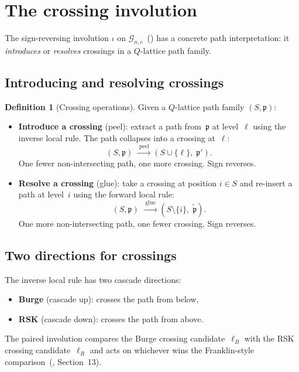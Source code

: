 \documentclass[11pt]{article}
\theoremstyle{plain}
\theoremstyle{definition}
\newtheorem{definition}[theorem]{Definition}
\begin{document}
\section{The crossing involution}
\label{sec:crossing-invol}

The sign-reversing involution $\iota$ on
$\mathcal{G}_{n,c}$~(\cite{LOCAL_RULE}) has a concrete
path interpretation: it \emph{introduces} or \emph{resolves}
crossings in a $Q$-lattice path family.


\subsection{Introducing and resolving crossings}

\begin{definition}[Crossing operations]
\label{def:crossing-ops}
Given a $Q$-lattice path family $(S, \mathfrak{p})$:
\begin{itemize}
  \item \textbf{Introduce a crossing} (peel): extract a
    path from~$\mathfrak{p}$ at level~$\ell$ using the
    inverse local rule.  The path collapses into a crossing
    at~$\ell$:
    \[
      (S, \mathfrak{p}) \;\xrightarrow{\;\text{peel}\;}
      (S \cup \{\ell\},\; \mathfrak{p}').
    \]
    One fewer non-intersecting path, one more crossing.
    Sign reverses.

  \item \textbf{Resolve a crossing} (glue): take a
    crossing at position $i \in S$ and re-insert a path
    at level~$i$ using the forward local rule:
    \[
      (S, \mathfrak{p}) \;\xrightarrow{\;\text{glue}\;}
      (S \setminus \{i\},\; \tilde{\mathfrak{p}}).
    \]
    One more non-intersecting path, one fewer crossing.
    Sign reverses.
\end{itemize}
\end{definition}


\subsection{Two directions for crossings}

The inverse local rule has two cascade directions:
\begin{itemize}
  \item \textbf{Burge} (cascade up): crosses the path
    from below,
  \item \textbf{RSK} (cascade down): crosses the path
    from above.
\end{itemize}
The paired involution compares the Burge crossing
candidate~$\ell_B$ with the RSK crossing candidate~$\ell_R$
and acts on whichever wins the Franklin-style
comparison~(\cite{LOCAL_RULE}, Section~13).
\end{document}
